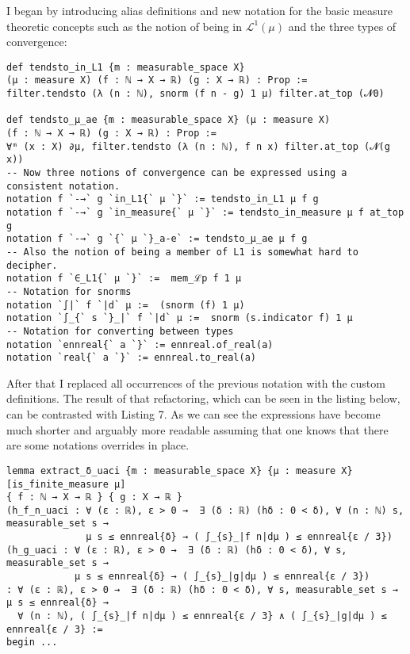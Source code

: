 \documentclass[11pt]{article}
\newenvironment{code}{\captionsetup{type=listing}}{}
\newcommand\Lmu{\mathcal{L}^1(\mu)}
\begin{document}
I began by introducing alias definitions and new notation for the basic measure theoretic concepts such
as the notion of being in $\Lmu$ and the three types of convergence:
\begin{code}
\begin{verbatim}
def tendsto_in_L1 {m : measurable_space X}
(μ : measure X) (f : ℕ → X → ℝ) (g : X → ℝ) : Prop :=
filter.tendsto (λ (n : ℕ), snorm (f n - g) 1 μ) filter.at_top (𝓝0)

def tendsto_μ_ae {m : measurable_space X} (μ : measure X)
(f : ℕ → X → ℝ) (g : X → ℝ) : Prop :=
∀ᵐ (x : X) ∂μ, filter.tendsto (λ (n : ℕ), f n x) filter.at_top (𝓝(g x))
-- Now three notions of convergence can be expressed using a consistent notation.
notation f `-→` g `in_L1{` μ `}` := tendsto_in_L1 μ f g
notation f `-→` g `in_measure{` μ `}` := tendsto_in_measure μ f at_top g
notation f `-→` g `{` μ `}_a-e` := tendsto_μ_ae μ f g
-- Also the notion of being a member of L1 is somewhat hard to decipher.
notation f `∈_L1{` μ `}` :=  mem_ℒp f 1 μ
-- Notation for snorms
notation `∫|` f `|d` μ :=  (snorm (f) 1 μ)
notation `∫_{` s `}_|` f `|d` μ :=  snorm (s.indicator f) 1 μ
-- Notation for converting between types
notation `ennreal{` a `}` := ennreal.of_real(a)
notation `real{` a `}` := ennreal.to_real(a)
\end{verbatim}
\end{code}

After that I replaced all occurrences of the previous notation with the custom
definitions. The result of that refactoring, which can be seen in the listing below,
can be contrasted with Listing 7. As we can see the expressions have become much
shorter and arguably more readable assuming that one knows that there are some
notations overrides in place.
\begin{code}
\begin{verbatim}
lemma extract_δ_uaci {m : measurable_space X} {μ : measure X} [is_finite_measure μ]
{ f : ℕ → X → ℝ } { g : X → ℝ }
(h_f_n_uaci : ∀ (ε : ℝ), ε > 0 →  ∃ (δ : ℝ) (hδ : 0 < δ), ∀ (n : ℕ) s, measurable_set s →
              μ s ≤ ennreal{δ} → ( ∫_{s}_|f n|dμ ) ≤ ennreal{ε / 3})
(h_g_uaci : ∀ (ε : ℝ), ε > 0 →  ∃ (δ : ℝ) (hδ : 0 < δ), ∀ s, measurable_set s →
            μ s ≤ ennreal{δ} → ( ∫_{s}_|g|dμ ) ≤ ennreal{ε / 3})
: ∀ (ε : ℝ), ε > 0 →  ∃ (δ : ℝ) (hδ : 0 < δ), ∀ s, measurable_set s → μ s ≤ ennreal{δ} →
  ∀ (n : ℕ), ( ∫_{s}_|f n|dμ ) ≤ ennreal{ε / 3} ∧ ( ∫_{s}_|g|dμ ) ≤ ennreal{ε / 3} :=
begin ...
\end{verbatim}
\end{code}
\end{document}

